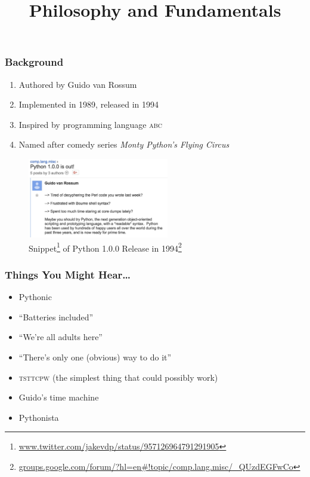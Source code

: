 \documentclass{beamer}
\title[Intro to Python]{Philosophy and Fundamentals}
\begin{document}
\frame{\titlepage}


\begin{frame}
  \frametitle{Background}
  \begin{enumerate}
    \item Authored by Guido van Rossum
    \item Implemented in 1989, released in 1994
    \item Inspired by programming language \textsc{abc}
    \item Named after comedy series \textit{Monty Python's Flying Circus}
  \end{enumerate}
  \begin{figure}
    \begin{center}
    \includegraphics[width=175pt,keepaspectratio]{release.jpg}
    \caption
    {
      Snippet\footnote{\url{www.twitter.com/jakevdp/status/957126964791291905}}
      of Python 1.0.0 Release in 
      1994\footnote
      {
       \url{groups.google.com/forum/?hl=en\#!topic/comp.lang.misc/_QUzdEGFwCo}
      }
    }
    \end{center}
  \end{figure}
\end{frame}


\begin{frame}
  \frametitle{Things You Might Hear\ldots}
  \begin{itemize}
    \item Pythonic
    \item ``Batteries included''
    \item ``We're all adults here''
    \item ``There's only one (obvious) way to do it''
    \item \textsc{tsttcpw} (the simplest thing that could possibly work)
    \item Guido's time machine
    \item Pythonista
  \end{itemize}
\end{frame}
\end{document}
